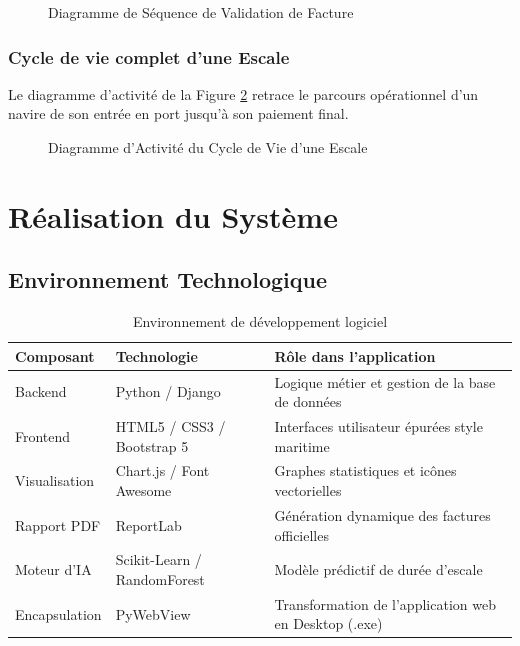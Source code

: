 \documentclass[12pt,a4paper,oneside]{report}
\begin{document}
\begin{figure}[H]
    \centering
    \color{gray}
    \caption{Diagramme de Séquence de Validation de Facture}
    \label{fig:seq_facture}
\end{figure}

\subsection{Cycle de vie complet d'une Escale}
Le diagramme d'activité de la Figure \ref{fig:activity_escale} retrace le parcours opérationnel d'un navire de son entrée en port jusqu'à son paiement final.

\begin{figure}[H]
    \centering
    \color{gray}
    \caption{Diagramme d'Activité du Cycle de Vie d'une Escale}
    \label{fig:activity_escale}
\end{figure}

\chapter{Réalisation du Système}

\section{Environnement Technologique}
\begin{table}[H]
\centering
\begin{tabular}{lll}
\toprule
\textbf{Composant} & \textbf{Technologie} & \textbf{Rôle dans l'application} \\
\midrule
Backend & Python / Django & Logique métier et gestion de la base de données \\
Frontend & HTML5 / CSS3 / Bootstrap 5 & Interfaces utilisateur épurées style maritime \\
Visualisation & Chart.js / Font Awesome & Graphes statistiques et icônes vectorielles \\
Rapport PDF & ReportLab & Génération dynamique des factures officielles \\
Moteur d'IA & Scikit-Learn / RandomForest & Modèle prédictif de durée d'escale \\
Encapsulation & PyWebView & Transformation de l'application web en Desktop (.exe) \\
\bottomrule
\end{tabular}
\caption{Environnement de développement logiciel}
\label{tab:env}
\end{table}
\end{document}
